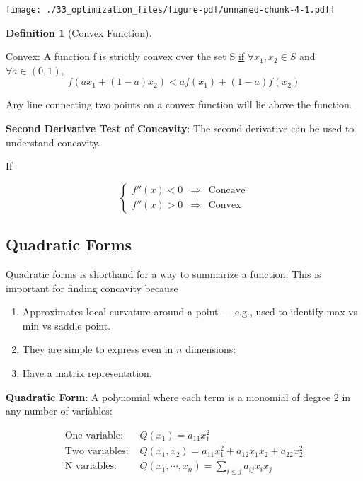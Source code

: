 \documentclass[
  letterpaper,
]{book}
\providecommand{\tightlist}{%
  \setlength{\itemsep}{0pt}\setlength{\parskip}{0pt}}\usepackage{longtable,booktabs,array}
\theoremstyle{definition}
\newtheorem{definition}{Definition}[chapter]
\theoremstyle{definition}
\theoremstyle{plain}
\theoremstyle{definition}
\theoremstyle{plain}
\theoremstyle{plain}
\theoremstyle{remark}
\begin{document}
\texttt{[image: ./33\_optimization\_files/figure-pdf/unnamed-chunk-4-1.pdf]}

\leavevmode{}%
\begin{definition}[Convex Function]\label{def-}

Convex: A function f is strictly convex over the set S \underline{if}
\(\forall x_1,x_2 \in S\) and \(\forall a \in (0,1)\),
\[f(ax_1 + (1-a)x_2) < af(x_1) + (1-a)f(x_2)\]

Any line connecting two points on a convex function will lie above the
function.

\end{definition}

\textbf{Second Derivative Test of Concavity}: The second derivative can
be used to understand concavity.

If

\[\left\{\begin{array}{lll}
f''(x) < 0 & \Rightarrow & \text{Concave}\\
f''(x) > 0 & \Rightarrow & \text{Convex}
\end{array}\right.\]

\hypertarget{quadratic-forms}{%
\subsection*{Quadratic Forms}\label{quadratic-forms}}

Quadratic forms is shorthand for a way to summarize a function. This is
important for finding concavity because

\begin{enumerate}
\def\labelenumi{\arabic{enumi}.}
\tightlist
\item
  Approximates local curvature around a point --- e.g., used to identify
  max vs min vs saddle point.
\item
  They are simple to express even in \(n\) dimensions:
\item
  Have a matrix representation.
\end{enumerate}

\textbf{Quadratic Form}: A polynomial where each term is a monomial of
degree 2 in any number of variables:

\begin{align*}
\text{One variable: }& Q(x_1) = a_{11}x_1^2\\
\text{Two variables: }& Q(x_1,x_2) = a_{11}x_1^2 + a_{12}x_1x_2 + a_{22}x_2^2\\
\text{N variables: }& Q(x_1,\cdots,x_n)=\sum\limits_{i\le j} a_{ij}x_i x_j
\end{align*}
\end{document}
